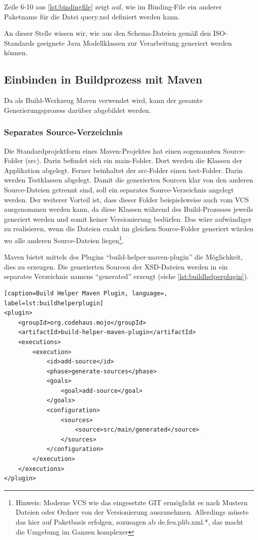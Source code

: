 Zeile 6-10 aus \autoref{lst:bindingfile} zeigt auf, wie im Binding-File ein anderer Paketname für die Datei query.xsd definiert werden kann. 

An dieser Stelle wissen wir, wie aus den Schema-Dateien gemäß den ISO-Standards geeignete Java Modellklassen zur Verarbeitung generiert werden können. 

\subsection{Einbinden in Buildprozess mit Maven}
Da als Build-Werkzeug \gls{Maven} verwendet wird, kann der gesamte Generierungsprozess darüber abgebildet werden. 

\subsubsection{Separates Source-Verzeichnis}
Die Standardprojektform eines \gls{Maven}-Projektes hat einen sogenannten Source-Folder (src). Darin befindet sich ein main-Folder. Dort werden die Klassen der Applikation abgelegt. Ferner beinhaltet der src-Folder einen test-Folder. Darin werden Testklassen abgelegt. 
Damit die generierten Sourcen klar von den anderen Source-Dateien getrennt sind, soll ein separates Source-Verzeichnis angelegt werden. Der weiterer Vorteil ist, dass dieser Folder beispielsweise auch vom \gls{VCS} ausgenommen werden kann, da diese Klassen während des Build-Prozesses jeweils generiert werden und somit keiner Versionierung bedürfen. Das wäre aufwändiger zu realisieren, wenn die Dateien exakt im gleichen Source-Folder generiert würden wo alle anderen Source-Dateien liegen\footnote{Hinweis: Moderne \gls{VCS} wie das eingesetzte GIT ermöglicht es nach Mustern Dateien oder Ordner von der Versionierung auszunehmen. Allerdings müsste das hier auf Paketbasis erfolgen, sozusagen ab de.feu.plib.xml.*, das macht die Umgebung im Ganzen komplexer}. 

\gls{Maven} bietet mittels des Plugins \enquote{build-helper-maven-plugin} die Möglichkeit, dies zu erzeugen. 
Die generierten Sourcen der XSD-Dateien werden in ein separates Verzeichnis namens \enquote{generated} erzeugt (siehe \autoref{lst:buildhelperplugin}). 

\begin{lstlisting}[caption=Build Helper Maven Plugin, language=, label=lst:buildhelperplugin]
<plugin>
    <groupId>org.codehaus.mojo</groupId>
    <artifactId>build-helper-maven-plugin</artifactId>
    <executions>
        <execution>
            <id>add-source</id>
            <phase>generate-sources</phase>
            <goals>
                <goal>add-source</goal>
            </goals>
            <configuration>
                <sources>
                    <source>src/main/generated</source>
                </sources>
            </configuration>
        </execution>
    </executions>
</plugin>
\end{lstlisting}

